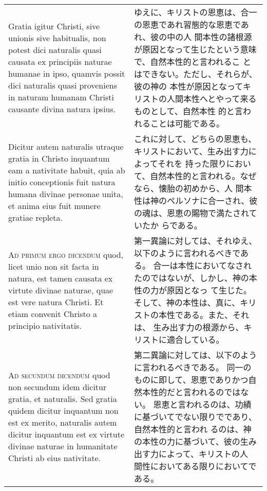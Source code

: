 \documentclass[10pt]{jsarticle} %
\begin{document}
\begin{longtable}{p{21em}p{21em}}
\\

Gratia igitur Christi, sive unionis
sive habitualis, non potest dici naturalis quasi causata ex principiis
naturae humanae in ipso, quamvis possit dici naturalis quasi proveniens
in naturam humanam Christi causante divina natura ipsius. 



&


ゆえに、キリストの恩恵は、合一の恩恵であれ習態的な恩恵であれ、彼の中の人
 間本性の諸根源が原因となって生じたという意味で、自然本性的と言われるこ
 とはできない。ただし、それらが、彼の神の
 本性が原因となってキリストの人間本性へとやって来るものとして、自然本性
 的と言われることは可能である。

\\

Dicitur autem
naturalis utraque gratia in Christo inquantum eam a nativitate habuit,
quia ab initio conceptionis fuit natura humana divinae personae unita,
et anima eius fuit munere gratiae repleta.


&

これに対して、どちらの恩恵も、キリストにおいて、生み出す力によってそれを
 持った限りにおいて、自然本性的と言われる。なぜなら、懐胎の初めから、人
 間本性は神のペルソナに合一され、彼の魂は、恩恵の賜物で満たされていたか
 らである。

\\



{\scshape Ad primum ergo dicendum} quod, licet unio non sit facta in natura, est
tamen causata ex virtute divinae naturae, quae est vere natura
Christi. Et etiam convenit Christo a principio nativitatis.


&

第一異論に対しては、それゆえ、以下のように言われるべきである。
合一は本性においてなされたのではないが、しかし、神の本性の力が原因となっ
 て生じた。そして、神の本性は、真に、キリストの本性である。また、それは、
 生み出す力の根源から、キリストに適合している。


\\



{\scshape Ad secundum dicendum} quod non secundum idem dicitur gratia, et
naturalis. Sed gratia quidem dicitur inquantum non est ex merito,
naturalis autem dicitur inquantum est ex virtute divinae naturae in
humanitate Christi ab eius nativitate.


&

第二異論に対しては、以下のように言われるべきである。
同一のものに即して、恩恵でありかつ自然本性的だと言われるのではない。
恩恵と言われるのは、功績に基づいてでない限りでであり、自然本性的と言われ
 るのは、神の本性の力に基づいて、彼の生み出す力によって、キリストの人
 間性においてある限りにおいてである。


\end{longtable}
\end{document}
